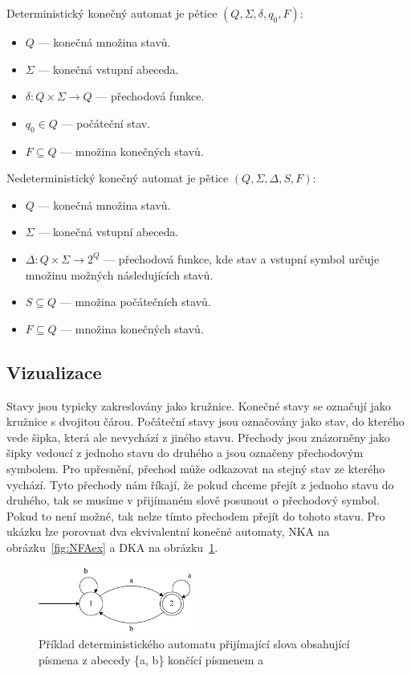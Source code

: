 \newpage

\noindent Deterministický konečný automat je pětice $(Q, \Sigma, \delta, q_0, F)$\cite{Viswanathan_2017}:
\begin{itemize}
	\item $Q$ --- konečná množina stavů.
	\item $\Sigma$ --- konečná vstupní abeceda.
	\item $\delta: Q \times \Sigma \rightarrow Q$ --- přechodová funkce.
	\item $q_0 \in Q$ --- počáteční stav.
	\item $F \subseteq Q$ --- množina konečných stavů.
\end{itemize}

\noindent Nedeterministický konečný automat je pětice $(Q, \Sigma, \Delta, S, F)$\cite{Viswanathan_2017}:
\begin{itemize}
	\item $Q$ --- konečná množina stavů.
	\item $\Sigma$ --- konečná vstupní abeceda.
	\item $\Delta: Q \times \Sigma \rightarrow 2^Q$ --- přechodová funkce, kde stav a vstupní symbol určuje množinu možných následujících stavů.
	\item $S \subseteq Q$ --- množina počátečních stavů.
	\item $F \subseteq Q$ --- množina konečných stavů.
\end{itemize}

\subsection*{Vizualizace}

Stavy jsou typicky zakreslovány jako kružnice. 
Konečné stavy se označují jako kružnice s dvojitou čárou. 
Počáteční stavy jsou označovány jako stav, do kterého vede šipka, která ale nevychází z jiného stavu.
Přechody jsou znázorněny jako šipky vedoucí z jednoho stavu do druhého a jsou označeny přechodovým symbolem.
Pro upřesnění, přechod může odkazovat na stejný stav ze kterého vychází.
Tyto přechody nám říkají, že pokud chceme přejít z jednoho stavu do druhého, tak se musíme v přijímaném slově posunout o přechodový symbol. 
Pokud to není možné, tak nelze tímto přechodem přejít do tohoto stavu.
Pro ukázku lze porovnat dva ekvivalentní konečné automaty, NKA na obrázku~\ref{fig:NFAex} a DKA na obrázku~\ref{fig:DFAex}.

\begin{figure}[!h]
	\centering
	\includegraphics[width=0.45\textwidth]{Figures/DFA_example.pdf}
	\caption{Příklad deterministického automatu přijímající slova obsahující písmena z abecedy \{a, b\} končící písmenem a}
	\label{fig:DFAex}
\end{figure}

